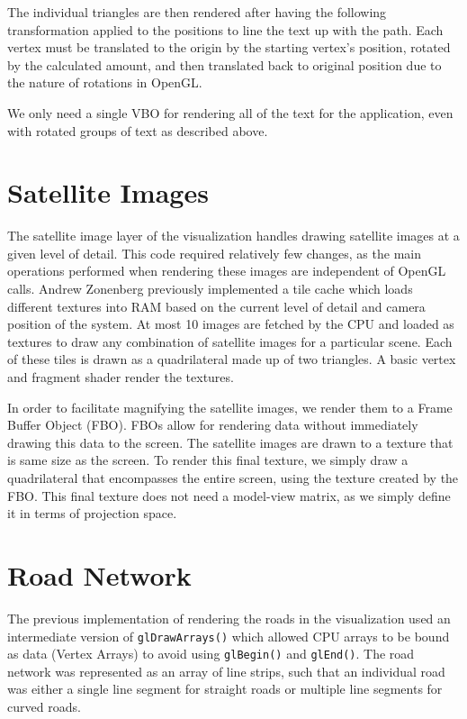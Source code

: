 The individual triangles are then rendered after having the following transformation applied to the positions to line the text up with the path. Each vertex must be translated to the origin by the starting vertex's position, rotated by the calculated amount, and then translated back to original position due to the nature of rotations in OpenGL\@. 

We only need a single VBO for rendering all of the text for the application, even with rotated 
groups of text as described above.

\section{Satellite Images}
\label{section:satellite_images}

The satellite image layer of the visualization handles drawing satellite images at a given level of detail. 
This code required relatively few changes, as the main operations performed when rendering 
these images are independent of OpenGL calls. Andrew Zonenberg previously implemented a tile cache which loads different textures into RAM based on the current level of detail and camera position of the system. At most 10 images are fetched by the CPU and loaded as textures to draw any combination of satellite images for a particular scene. Each of these tiles is drawn as a quadrilateral made up of two triangles. A basic vertex and fragment shader render the textures.

In order to facilitate magnifying the satellite images, we render them to a Frame Buffer 
Object (FBO). FBOs allow for rendering data without immediately drawing this data to the screen. The satellite images are drawn to a texture that is same size as the screen. To render this final texture, we simply draw a quadrilateral that encompasses the entire screen, using the texture created by the FBO\@. 
This final texture does not need a model-view matrix, as we simply define it in terms of projection 
space.

\section{Road Network}
\label{section:road_network}

The previous implementation of rendering the roads in the visualization used an intermediate 
version of {\tt glDrawArrays()} which allowed CPU arrays to be bound as data (Vertex Arrays) to avoid using {\tt glBegin()} and {\tt glEnd()}. The road network was represented as an array of line strips, such that an individual road was either a single line segment for straight roads or multiple line segments for curved roads.

